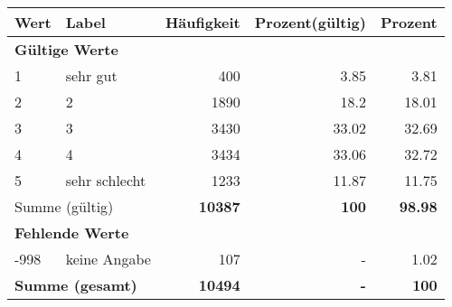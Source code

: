      \begin{longtable}{lXrrr}
     \toprule
     \textbf{Wert} & \textbf{Label} & \textbf{Häufigkeit} & \textbf{Prozent(gültig)} & \textbf{Prozent} \\
     \endhead
     \midrule
     \multicolumn{5}{l}{\textbf{Gültige Werte}}\\

     1 &
     \multicolumn{1}{X}{ sehr gut   } &


       \num{400} &
       \num[round-mode=places,round-precision=2]{3.85} &
         \num[round-mode=places,round-precision=2]{3.81} \\

     2 &
     \multicolumn{1}{X}{ 2   } &


       \num{1890} &
       \num[round-mode=places,round-precision=2]{18.2} &
         \num[round-mode=places,round-precision=2]{18.01} \\

     3 &
     \multicolumn{1}{X}{ 3   } &


       \num{3430} &
       \num[round-mode=places,round-precision=2]{33.02} &
         \num[round-mode=places,round-precision=2]{32.69} \\

     4 &
     \multicolumn{1}{X}{ 4   } &


       \num{3434} &
       \num[round-mode=places,round-precision=2]{33.06} &
         \num[round-mode=places,round-precision=2]{32.72} \\

     5 &
     \multicolumn{1}{X}{ sehr schlecht   } &


       \num{1233} &
       \num[round-mode=places,round-precision=2]{11.87} &
         \num[round-mode=places,round-precision=2]{11.75} \\
     \midrule
     \multicolumn{2}{l}{Summe (gültig)} &
       \textbf{\num{10387}} &
     \textbf{\num{100}} &
       \textbf{\num[round-mode=places,round-precision=2]{98.98}} \\
     \multicolumn{5}{l}{\textbf{Fehlende Werte}}\\
       -998 &
       keine Angabe &
         \num{107} &
        - &
         \num[round-mode=places,round-precision=2]{1.02} \\
     \midrule
     \multicolumn{2}{l}{\textbf{Summe (gesamt)}} &
          \textbf{\num{10494}} &
        \textbf{-} &
        \textbf{\num{100}} \\
     \bottomrule
     \end{longtable}
     
